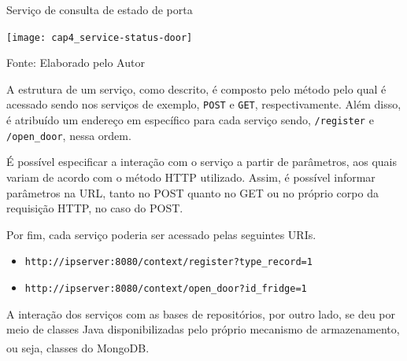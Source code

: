 \begin{quadro}[htb]
    \caption{Serviço de consulta de estado de porta}
    \label{fig:cap4_service-status-door}
    \texttt{[image: cap4\_service-status-door]}
    
    \footnotesize{Fonte: Elaborado pelo Autor}
\end{quadro}

A estrutura de um serviço, como descrito, é composto pelo método pelo qual é acessado sendo nos serviços de exemplo, \texttt{POST} e \texttt{GET}, respectivamente. Além disso, é atribuído um endereço em específico para cada serviço sendo, \texttt{/register} e \texttt{/open\_door}, nessa ordem. 

É possível especificar a interação com o serviço a partir de parâmetros, aos quais variam de acordo com o método HTTP utilizado. Assim, é possível informar parâmetros na URL, tanto no POST quanto no GET ou no próprio corpo da requisição HTTP, no caso do POST.

Por fim, cada serviço poderia ser acessado pelas seguintes URIs.

\begin{itemize} \parskip -4pt
    \item \texttt{http://ipserver:8080/context/register?type\_record=1}
    \item \texttt{http://ipserver:8080/context/open\_door?id\_fridge=1}
\end{itemize}

A interação dos serviços com as bases de repositórios, por outro lado, se deu por meio de classes Java disponibilizadas pelo próprio mecanismo de armazenamento, ou seja, classes do MongoDB\textsuperscript{\textregistered}.



